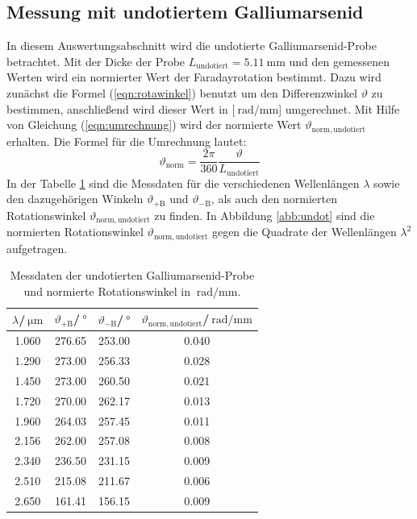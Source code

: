 \subsection{Messung mit undotiertem Galliumarsenid}
\label{sec:undotiert}
In diesem Auswertungsabschnitt wird die undotierte Galliumarsenid-Probe betrachtet.
Mit der Dicke der Probe $L_\mathrm{undotiert}=\SI{5.11}{\milli\meter}$ und den gemessenen Werten wird ein normierter Wert der Faradayrotation bestimmt. Dazu wird zunächst die Formel (\ref{eqn:rotawinkel}) benutzt um den Differenzwinkel $\vartheta$ zu bestimmen, anschließend
wird dieser Wert in [$\SI{}{\radian\per\milli\meter}$] umgerechnet. Mit Hilfe von Gleichung (\ref{eqn:umrechnung}) wird der normierte Wert $\vartheta_\mathrm{norm,undotiert}$ erhalten. Die Formel für die Umrechnung lautet:
\begin{equation}
  \label{eqn:umrechnung}
  \vartheta_\mathrm{norm}=\dfrac{2\pi}{360}\dfrac{\vartheta}{L_\mathrm{undotiert}}
\end{equation}
In der Tabelle \ref{tab:undot} sind die Messdaten für die verschiedenen Wellenlängen $\lambda$ sowie den dazugehörigen Winkeln $\vartheta_\mathrm{+B}$ und $\vartheta_\mathrm{-B}$, als auch den normierten Rotationswinkel $\vartheta_\mathrm{norm,undotiert}$ zu finden.
In Abbildung \ref{abb:undot} sind die normierten Rotationswinkel $\vartheta_\mathrm{norm,undotiert}$ gegen die Quadrate der Wellenlängen $\lambda^2$ aufgetragen.
\begin{table}
  \centering
  \caption{Messdaten der undotierten Galliumarsenid-Probe und normierte Rotationswinkel in $\SI{}{\radian\per\milli\meter}$.}
  \label{tab:undot}
  \begin{tabular}{c | c | c | c}
    \toprule
    $\lambda$/$\SI{}{\micro\meter}$ & $\vartheta_\mathrm{+B}$/$\SI{}{\degree}$ & $\vartheta_\mathrm{-B}$/$\SI{}{\degree}$& $\vartheta_{\mathrm{norm,undotiert}}$/$\SI{}{\radian\per\milli\meter}$ \\
    \midrule
    1.060 & 276.65 & 253.00 & 0.040 \\
    1.290 & 273.00 & 256.33 & 0.028 \\
    1.450 & 273.00 & 260.50 & 0.021 \\
    1.720 & 270.00 & 262.17 & 0.013 \\
    1.960 & 264.03 & 257.45 & 0.011 \\
    2.156 & 262.00 & 257.08 & 0.008 \\
    2.340 & 236.50 & 231.15 & 0.009 \\
    2.510 & 215.08 & 211.67 & 0.006 \\
    2.650 & 161.41 & 156.15 & 0.009 \\
    \bottomrule
  \end{tabular}
\end{table}
\FloatBarrier

